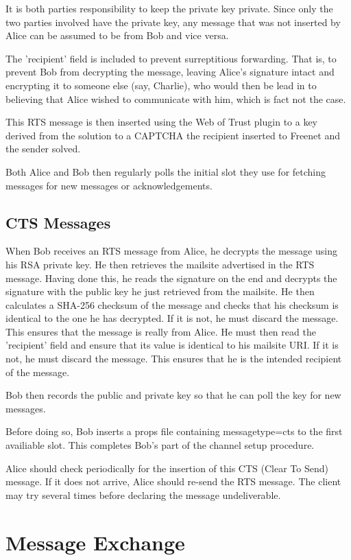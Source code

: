 \documentclass[12pt,a4paper]{article}
\begin{document}
It is both parties responsibility to keep the private key private. Since only the two parties
involved have the private key, any message that was not inserted by Alice can be assumed to be from
Bob and vice versa.

The 'recipient' field is included to prevent surreptitious forwarding. That is, to prevent Bob from
decrypting the message, leaving Alice's signature intact and encrypting it to someone else (say,
Charlie), who would then be lead in to believing that Alice wished to communicate with him, which is
fact not the case.

This RTS message is then inserted using the Web of Trust plugin to a key derived from the solution
to a CAPTCHA the recipient inserted to Freenet and the sender solved.

Both Alice and Bob then regularly polls the initial slot they use for fetching messages for new
messages or acknowledgements.

\subsection{CTS Messages}
When Bob receives an RTS message from Alice, he decrypts the message using his RSA private key. He
then retrieves the mailsite advertised in the RTS message. Having done this, he reads the signature
on the end and decrypts the signature with the public key he just retrieved from the mailsite. He
then calculates a SHA-256 checksum of the message and checks that his checksum is identical to the
one he has decrypted. If it is not, he must discard the message. This ensures that the message is
really from Alice. He must then read the 'recipient' field and ensure that its value is identical to his
mailsite URI. If it is not, he must discard the message. This ensures that he is the intended
recipient of the message.

Bob then records the public and private key so that he can poll the key for new messages.

Before doing so, Bob inserts a props file containing messagetype=cts to the first availiable slot.
This completes Bob's part of the channel setup procedure.

Alice should check periodically for the insertion of this CTS (Clear To Send) message. If it does not arrive, Alice
should re-send the RTS message. The client may try several times before declaring the message
undeliverable.

\section{Message Exchange}
\end{document}
